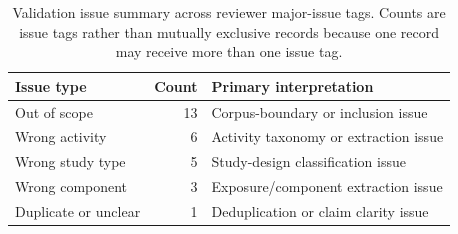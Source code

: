 \begin{table}[t]
\centering
\small
\caption{Validation issue summary across reviewer major-issue tags. Counts are issue tags rather than mutually exclusive records because one record may receive more than one issue tag.}
\label{tab:validation_error_summary}
\begin{tabularx}{\linewidth}{lrl}
\toprule
Issue type & Count & Primary interpretation \\
\midrule
Out of scope & 13 & Corpus-boundary or inclusion issue \\
Wrong activity & 6 & Activity taxonomy or extraction issue \\
Wrong study type & 5 & Study-design classification issue \\
Wrong component & 3 & Exposure/component extraction issue \\
Duplicate or unclear & 1 & Deduplication or claim clarity issue \\
\bottomrule
\end{tabularx}
\end{table}
